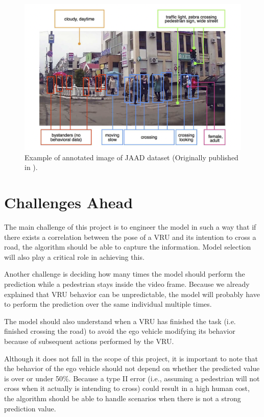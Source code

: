 \documentclass[journal,letterpaper]{IEEEtran}
\begin{document}
\begin{figure}[h]
  \centering
  \includegraphics[width=.75\columnwidth]{figures/jaad-dataset.png}
  \caption{Example of annotated image of JAAD dataset (Originally published in \cite{rasouli2017ICCVW}).}
  \label{fig:dataset:jaad}
\end{figure}

\section{Challenges Ahead}\label{sec:challenges}
The main challenge of this project is to engineer the model in such a way that if there exists a correlation between the pose of a VRU and its intention to cross a road, the algorithm should be able to capture the information. Model selection will also play a critical role in achieving this.

Another challenge is deciding how many times the model should perform the prediction while a pedestrian stays inside the video frame. Because we already explained that VRU behavior can be unpredictable, the model will probably have to perform the prediction over the same individual multiple times. 

The model should also understand when a VRU has finished the task (i.e. finished crossing the road) to avoid the ego vehicle modifying its behavior because of subsequent actions performed by the VRU. 

Although it does not fall in the scope of this project, it is important to note that the behavior of the ego vehicle should not depend on whether the predicted value is over or under 50\%. Because a type II error (i.e., assuming a pedestrian will not cross when it actually is intending to cross) could result in a high human cost, the algorithm should be able to handle scenarios when there is not a strong prediction value. 
\end{document}
